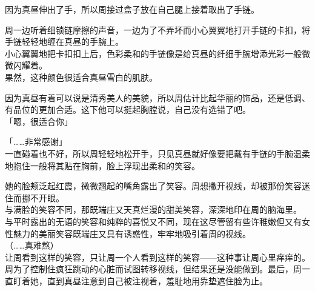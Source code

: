 因为真昼伸出了手，所以周接过盒子放在自己腿上接着取出了手链。

周一边听着细锁链摩擦的声音，一边为了不弄坏而小心翼翼地打开手链的卡扣，将手链轻轻地缠在真昼的手腕上。\\

小心翼翼地把卡扣扣上后，色彩柔和的手链像是给真昼的纤细手腕增添光彩一般微微闪耀着。\\

果然，这种颜色很适合真昼雪白的肌肤。

因为真昼有着可以说是清秀美人的美貌，所以周估计比起华丽的饰品，还是低调、有品位的更加合适。这下他可以挺起胸膛说，自己没有选错了吧。\\

「嗯，很适合你」

「……非常感谢」\\

一直碰着也不好，所以周轻轻地松开手，只见真昼就好像要把戴有手链的手腕温柔地抱住一般将其贴在胸前，脸上浮现出柔和的笑容。

她的脸颊泛起红霞，微微翘起的嘴角露出了笑容。周想撇开视线，却被那份笑容迷住而挪不开眼。\\

与满脸的笑容不同，那既端庄又天真烂漫的甜美笑容，深深地印在周的脑海里。\\

与平时露出的无语的笑容和纯粹的喜悦又不同，现在这尽管留有些许稚嫩但又有女性魅力的美丽笑容既端庄又具有诱惑性，牢牢地吸引着周的视线。\\

（……真难熬）\\

让周看到这样的笑容，只让周一个人看到这样的笑容——这种事让周心里痒痒的。\\

周为了控制住疯狂跳动的心脏而试图转移视线，但结果还是没能做到。最后，周一直盯着她，直到真昼注意到自己被注视着，羞耻地用靠垫遮住脸为止。
